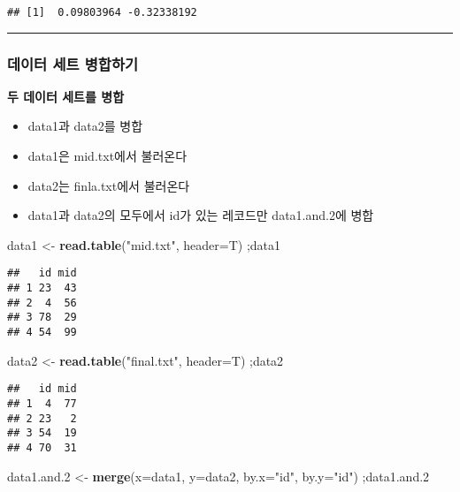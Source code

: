 \documentclass[]{article}
\newenvironment{Shaded}{\begin{snugshade}}{\end{snugshade}}
\newcommand{\KeywordTok}[1]{\textcolor[rgb]{0.13,0.29,0.53}{\textbf{#1}}}
\newcommand{\DataTypeTok}[1]{\textcolor[rgb]{0.13,0.29,0.53}{#1}}
\newcommand{\DecValTok}[1]{\textcolor[rgb]{0.00,0.00,0.81}{#1}}
\newcommand{\StringTok}[1]{\textcolor[rgb]{0.31,0.60,0.02}{#1}}
\newcommand{\NormalTok}[1]{#1}
\providecommand{\tightlist}{%
  \setlength{\itemsep}{0pt}\setlength{\parskip}{0pt}}
\begin{document}
\begin{verbatim}
## [1]  0.09803964 -0.32338192
\end{verbatim}

\begin{center}\rule{0.5\linewidth}{\linethickness}\end{center}

\subsubsection{데이터 세트 병합하기}\label{--}

\textbf{두 데이터 세트를 병합}

\begin{itemize}
\tightlist
\item
  data1과 data2를 병합
\item
  data1은 mid.txt에서 불러온다
\item
  data2는 finla.txt에서 불러온다
\item
  data1과 data2의 모두에서 id가 있는 레코드만 data1.and.2에 병합
\end{itemize}

\begin{Shaded}
\begin{Highlighting}[]
\NormalTok{data1 <-}\StringTok{ }\KeywordTok{read.table}\NormalTok{(}\StringTok{"mid.txt"}\NormalTok{, }\DataTypeTok{header=}\NormalTok{T) ;data1}
\end{Highlighting}
\end{Shaded}

\begin{verbatim}
##   id mid
## 1 23  43
## 2  4  56
## 3 78  29
## 4 54  99
\end{verbatim}

\begin{Shaded}
\begin{Highlighting}[]
\NormalTok{data2 <-}\StringTok{ }\KeywordTok{read.table}\NormalTok{(}\StringTok{"final.txt"}\NormalTok{, }\DataTypeTok{header=}\NormalTok{T) ;data2}
\end{Highlighting}
\end{Shaded}

\begin{verbatim}
##   id mid
## 1  4  77
## 2 23   2
## 3 54  19
## 4 70  31
\end{verbatim}

\begin{Shaded}
\begin{Highlighting}[]
\NormalTok{data1.and.}\DecValTok{2}\NormalTok{ <-}\StringTok{ }\KeywordTok{merge}\NormalTok{(}\DataTypeTok{x=}\NormalTok{data1, }\DataTypeTok{y=}\NormalTok{data2, }\DataTypeTok{by.x=}\StringTok{"id"}\NormalTok{, }\DataTypeTok{by.y=}\StringTok{"id"}\NormalTok{) ;data1.and.}\DecValTok{2}
\end{Highlighting}
\end{Shaded}
\end{document}
